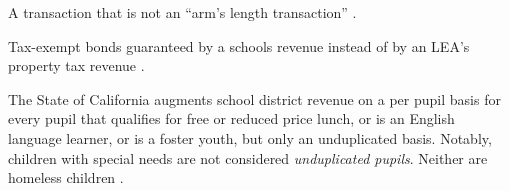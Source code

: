 \begin{description}[nosep]
\medskip\item[related party transaction]  A transaction that is not an ``arm's length transaction'' \parencite{Kenton2022}.

\medskip\item[revenue bonds] Tax-exempt bonds guaranteed by a schools revenue instead of by an LEA's property tax revenue \parencite{Chen2021}.

\medskip\item[unduplicated pupils] The State of California augments school district revenue on a per pupil basis for every pupil that qualifies for free or reduced price lunch, or is an English language learner, or is a foster youth, but only an unduplicated basis. Notably, children with special needs are not considered \textit{unduplicated pupils}. Neither are homeless children \parencite{CDE2015}.

\end{description}

